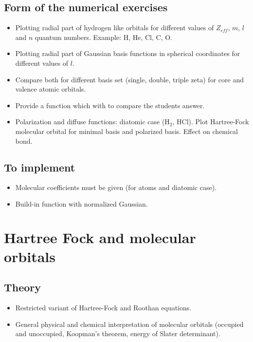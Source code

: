 \documentclass[12pt]{article}
\begin{document}
\subsection{Form of the numerical exercises}
\begin{itemize}
 \item Plotting radial part of hydrogen like orbitals for different values of $Z_{eff}$, $m$, $l$ and $n$ quantum numbers. Example: H, He, Cl, C, O. 
 \item Plotting radial part of Gaussian basis functions in spherical coordinates for different values of $l$.
 \item Compare both for different basis set (single, double, triple zeta) for core and valence atomic orbitals.
 \item Provide a function which with to compare the students answer.
 \item Polarization and diffuse functions: diatomic case (H$_{2}$, HCl). Plot Hartree-Fock molecular orbital for minimal basis and polarized basis. Effect on chemical bond.    
\end{itemize}

\subsection{To implement}

\begin{itemize}
\item Molecular coefficients must be given (for atoms and diatomic case).
\item Build-in function with normalized Gaussian.  
\end{itemize}

\section{Hartree Fock and molecular orbitals}

\subsection{Theory}

\begin{itemize}
\item Restricted variant of Hartree-Fock and Roothan equations. 
\item General physical and chemical interpretation of molecular orbitals (occupied and unoccupied, Koopman's theorem, energy of Slater determinant).
\end{itemize}
  
\end{document}
